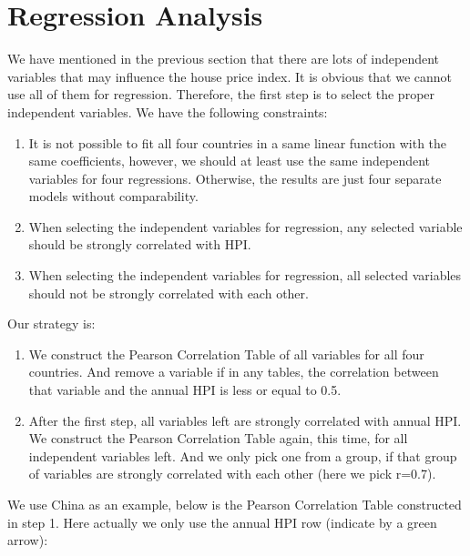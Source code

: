 \documentclass[11pt]{article}
\begin{document}
\section{Regression Analysis}\label{regression_analysis}
We have mentioned in the previous section that there are lots of independent variables that may influence the house price index. It is obvious that we cannot use all of them for regression. Therefore, the first step is to select the proper independent variables. We have the following constraints:
\begin{enumerate}
    \item It is not possible to fit all four countries in a same linear function with the same coefficients, however, we should at least use the same independent variables for four regressions. Otherwise, the results are just four separate models without comparability.
    \item When selecting the independent variables for regression, any selected variable should be strongly correlated with HPI.
    \item When selecting the independent variables for regression, all selected variables should not be strongly correlated with each other.
\end{enumerate}
Our strategy is\citep{Feature}:
\begin{enumerate}
    \item We construct the Pearson Correlation Table of all variables for all four countries. And remove a variable if in any tables, the correlation between that variable and the annual HPI is less or equal to 0.5.
    \item After the first step, all variables left are strongly correlated with annual HPI. We construct the Pearson Correlation Table again, this time, for all independent variables left. And we only pick one from a group, if that group of variables are strongly correlated with each other (here we pick r=0.7). 
\end{enumerate}
We use China as an example, below is the Pearson Correlation Table constructed in step 1. Here actually we only use the annual HPI row (indicate by a green arrow):
\end{document}

